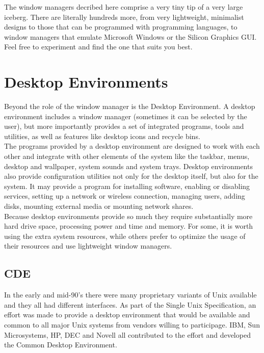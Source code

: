 The window managers decribed here comprise a very tiny tip of a very large iceberg.  There are literally hundreds more, from very lightweight, minimalist designs to those that can be programmed with programming languages, to window managers that emulate Microsoft Windows or the Silicon Graphics GUI.\\

Feel free to experiment and find the one that suits you best.

\section{Desktop Environments}

Beyond the role of the window manager is the Desktop Environment.  A desktop environment includes a window manager (sometimes it can be selected by the user), but more importantly provides a set of integrated programs, tools and utilities, as well as features like desktop icons and recycle bins.\\

The programs provided by a desktop environment are designed to work with each other and integrate with other elements of the system like the taskbar, menus, desktop and wallpaper, system sounds and system trays.  Desktop environments also provide configuration utilities not only for the desktop itself, but also for the system.  It may provide a program for installing software, enabling or disabling services, setting up a network or wireless connection, managing users, adding disks, mounting external media or mounting network shares.\\

Because desktop environments provide so much they require substantially more hard drive space, processing power and time and memory.  For some, it is worth using the extra system resources, while others prefer to optimize the usage of their resources and use lightweight window managers.

\subsection{CDE}

In the early and mid-90's there were many proprietary variants of Unix available and they all had different interfaces.  As part of the Single Unix Specification, an effort was made to provide a desktop environment that would be available and common to all major Unix systems from vendors willing to participage.  IBM, Sun Microsystems, HP, DEC and Novell all contributed to the effort and developed the Common Desktop Environment.\\

